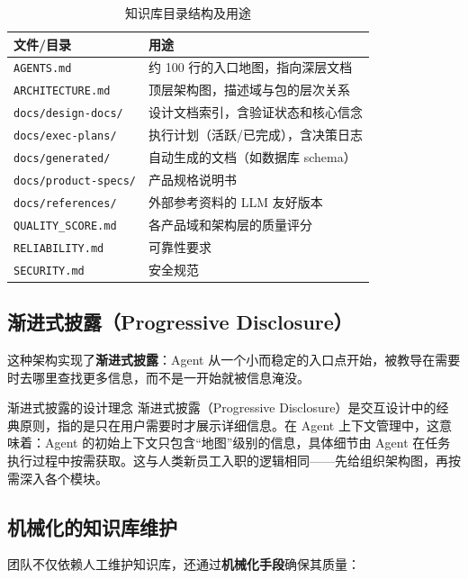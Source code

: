 \begin{table}[H]
\centering
\small
\begin{tabular}{p{5cm}p{8cm}}
\toprule
\textbf{文件/目录} & \textbf{用途} \\
\midrule
\texttt{AGENTS.md} & 约 100 行的入口地图，指向深层文档 \\
\texttt{ARCHITECTURE.md} & 顶层架构图，描述域与包的层次关系 \\
\texttt{docs/design-docs/} & 设计文档索引，含验证状态和核心信念 \\
\texttt{docs/exec-plans/} & 执行计划（活跃/已完成），含决策日志 \\
\texttt{docs/generated/} & 自动生成的文档（如数据库 schema） \\
\texttt{docs/product-specs/} & 产品规格说明书 \\
\texttt{docs/references/} & 外部参考资料的 LLM 友好版本 \\
\texttt{QUALITY\_SCORE.md} & 各产品域和架构层的质量评分 \\
\texttt{RELIABILITY.md} & 可靠性要求 \\
\texttt{SECURITY.md} & 安全规范 \\
\bottomrule
\end{tabular}
\caption{知识库目录结构及用途}
\end{table}

\subsection{渐进式披露（Progressive Disclosure）}

这种架构实现了\textbf{渐进式披露}：Agent 从一个小而稳定的入口点开始，被教导在需要时去哪里查找更多信息，而不是一开始就被信息淹没。

\begin{knowledgebox}{渐进式披露的设计理念}
渐进式披露（Progressive Disclosure）是交互设计中的经典原则，指的是只在用户需要时才展示详细信息。在 Agent 上下文管理中，这意味着：Agent 的初始上下文只包含``地图''级别的信息，具体细节由 Agent 在任务执行过程中按需获取。这与人类新员工入职的逻辑相同——先给组织架构图，再按需深入各个模块。
\end{knowledgebox}

\subsection{机械化的知识库维护}

团队不仅依赖人工维护知识库，还通过\textbf{机械化手段}确保其质量：

